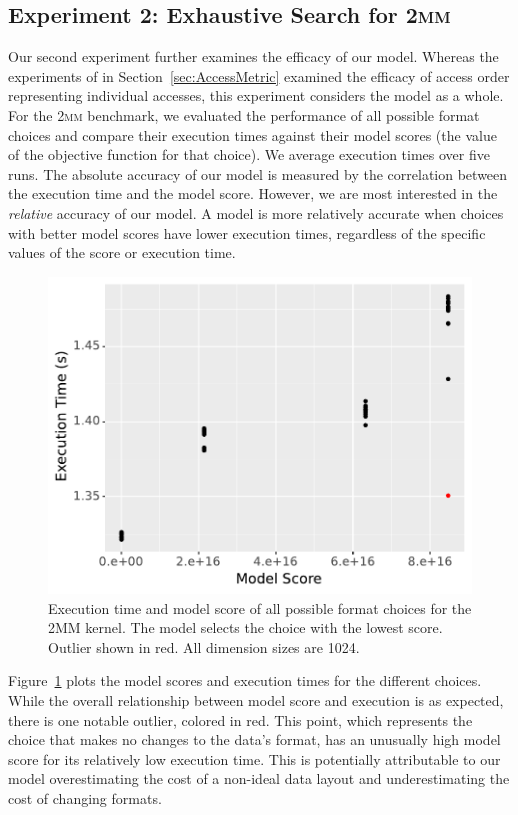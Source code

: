 \documentclass[sigconf,review=true]{acmart}
\begin{document}
\subsection{Experiment 2: Exhaustive Search for \textsc{2mm}}

Our second experiment further examines the efficacy of our model. 
Whereas the experiments of in Section~\ref{sec:AccessMetric} examined the efficacy of access order representing individual accesses, this experiment considers the model as a whole.
For the \textsc{2mm} benchmark, we evaluated the performance of all possible format choices and compare their execution times against their model scores (the value of the objective function for that choice).
We average execution times over five runs.
The absolute accuracy of our model is measured by the correlation between the execution time and the model score.
However, we are most interested in the \textit{relative} accuracy of our model.
A model is more relatively accurate when choices with better model scores have lower execution times, regardless of the specific values of the score or execution time.

\begin{figure}
	\includegraphics[width=\columnwidth]{2mm-all.pdf}
	\caption{Execution time and model score of all possible format choices for the 2MM kernel. The model selects the choice with the lowest score. Outlier shown in red. All dimension sizes are 1024.}
	\label{2MMAllChoices}
\end{figure}


Figure~\ref{2MMAllChoices} plots the model scores and execution times for the different choices. 
While the overall relationship between model score and execution is as expected, there is one notable outlier, colored in red.
This point, which represents the choice that makes no changes to the data's format, has an unusually high model score for its relatively low execution time. 
This is potentially attributable to our model overestimating the cost of a non-ideal data layout and underestimating the cost of changing formats. 
\end{document}
